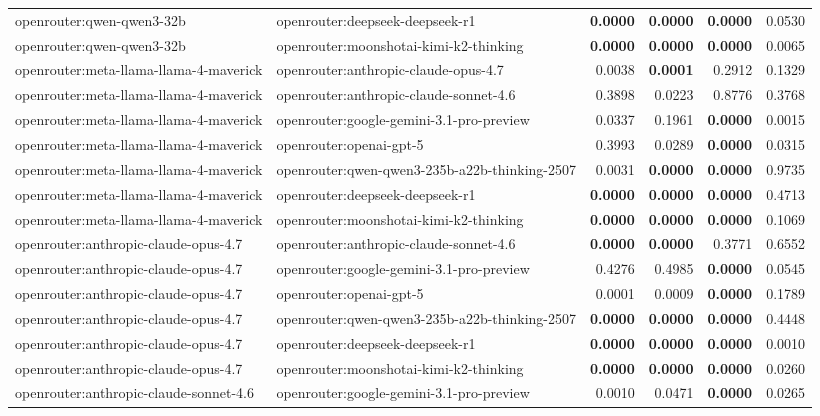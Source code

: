 \begin{table}[t]
\begin{tabular}{llrrrr}
openrouter:qwen-qwen3-32b & openrouter:deepseek-deepseek-r1 & \textbf{0.0000} & \textbf{0.0000} & \textbf{0.0000} & 0.0530 \\
openrouter:qwen-qwen3-32b & openrouter:moonshotai-kimi-k2-thinking & \textbf{0.0000} & \textbf{0.0000} & \textbf{0.0000} & 0.0065 \\
openrouter:meta-llama-llama-4-maverick & openrouter:anthropic-claude-opus-4.7 & 0.0038 & \textbf{0.0001} & 0.2912 & 0.1329 \\
openrouter:meta-llama-llama-4-maverick & openrouter:anthropic-claude-sonnet-4.6 & 0.3898 & 0.0223 & 0.8776 & 0.3768 \\
openrouter:meta-llama-llama-4-maverick & openrouter:google-gemini-3.1-pro-preview & 0.0337 & 0.1961 & \textbf{0.0000} & 0.0015 \\
openrouter:meta-llama-llama-4-maverick & openrouter:openai-gpt-5 & 0.3993 & 0.0289 & \textbf{0.0000} & 0.0315 \\
openrouter:meta-llama-llama-4-maverick & openrouter:qwen-qwen3-235b-a22b-thinking-2507 & 0.0031 & \textbf{0.0000} & \textbf{0.0000} & 0.9735 \\
openrouter:meta-llama-llama-4-maverick & openrouter:deepseek-deepseek-r1 & \textbf{0.0000} & \textbf{0.0000} & \textbf{0.0000} & 0.4713 \\
openrouter:meta-llama-llama-4-maverick & openrouter:moonshotai-kimi-k2-thinking & \textbf{0.0000} & \textbf{0.0000} & \textbf{0.0000} & 0.1069 \\
openrouter:anthropic-claude-opus-4.7 & openrouter:anthropic-claude-sonnet-4.6 & \textbf{0.0000} & \textbf{0.0000} & 0.3771 & 0.6552 \\
openrouter:anthropic-claude-opus-4.7 & openrouter:google-gemini-3.1-pro-preview & 0.4276 & 0.4985 & \textbf{0.0000} & 0.0545 \\
openrouter:anthropic-claude-opus-4.7 & openrouter:openai-gpt-5 & 0.0001 & 0.0009 & \textbf{0.0000} & 0.1789 \\
openrouter:anthropic-claude-opus-4.7 & openrouter:qwen-qwen3-235b-a22b-thinking-2507 & \textbf{0.0000} & \textbf{0.0000} & \textbf{0.0000} & 0.4448 \\
openrouter:anthropic-claude-opus-4.7 & openrouter:deepseek-deepseek-r1 & \textbf{0.0000} & \textbf{0.0000} & \textbf{0.0000} & 0.0010 \\
openrouter:anthropic-claude-opus-4.7 & openrouter:moonshotai-kimi-k2-thinking & \textbf{0.0000} & \textbf{0.0000} & \textbf{0.0000} & 0.0260 \\
openrouter:anthropic-claude-sonnet-4.6 & openrouter:google-gemini-3.1-pro-preview & 0.0010 & 0.0471 & \textbf{0.0000} & 0.0265 \\

\end{tabular}
\end{table}
